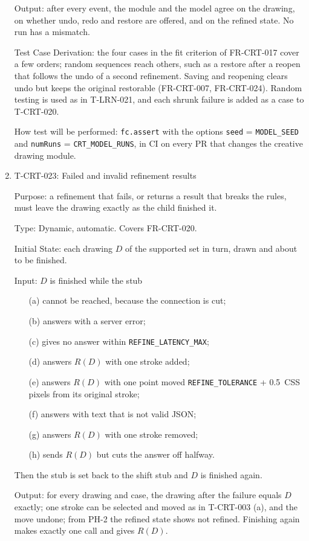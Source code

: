 \documentclass[12pt, titlepage]{article}
\newcommand{\testitem}[1]{\item #1\par\nopagebreak}
\begin{document}
\begin{enumerate}
Output: after every event, the module and the model agree on the drawing,
on whether undo, redo and restore are offered, and on the refined state.
No run has a mismatch.

Test Case Derivation: the four cases in the fit criterion of FR-CRT-017 cover
a few orders; random sequences reach others, such as a restore after a
reopen that follows the undo of a second refinement. Saving and reopening
clears undo but keeps the original restorable (FR-CRT-007, FR-CRT-024).
Random testing is used as in T-LRN-021, and each shrunk failure is added as
a case to T-CRT-020.

How test will be performed: \texttt{fc.assert} with the options
\texttt{seed} = \texttt{MODEL\_SEED} and \texttt{numRuns} =
\texttt{CRT\_MODEL\_RUNS}, in CI on every PR that changes the creative
drawing module.

\testitem{T-CRT-023: Failed and invalid refinement results}

Purpose: a refinement that fails, or returns a result that breaks the rules,
must leave the drawing exactly as the child finished it.

Type: Dynamic, automatic. Covers FR-CRT-020.

Initial State: each drawing $D$ of the supported set in turn, drawn and
about to be finished.

Input: $D$ is finished while the stub
\begin{itemize}
\item[(a)] cannot be reached, because the connection is cut;
\item[(b)] answers with a server error;
\item[(c)] gives no answer within \texttt{REFINE\_LATENCY\_MAX};
\item[(d)] answers $R(D)$ with one stroke added;
\item[(e)] answers $R(D)$ with one point moved \texttt{REFINE\_TOLERANCE} +
0.5~CSS pixels from its original stroke;
\item[(f)] answers with text that is not valid JSON;
\item[(g)] answers $R(D)$ with one stroke removed;
\item[(h)] sends $R(D)$ but cuts the answer off halfway.
\end{itemize}
Then the stub is set back to the shift stub and $D$ is finished again.

Output: for every drawing and case, the drawing after the failure equals
$D$ exactly; one stroke can be selected and moved as in T-CRT-003 (a), and
the move undone; from PH-2 the refined state shows not refined. Finishing
again makes exactly one call and gives $R(D)$.


\end{enumerate}
\end{document}
